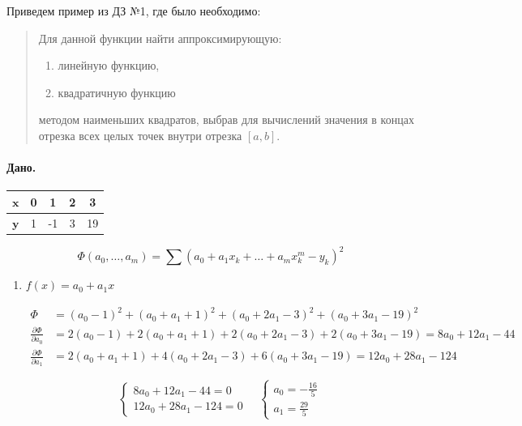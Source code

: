 \begin{example}
	Приведем пример из ДЗ №1, где было необходимо:
	\begin{quote}
		Для данной функции найти аппроксимирующую:
		\begin{enumerate}[label={\textbf{\alph*)}}, ref={\alph*}]
			\item линейную функцию,
			
			\item квадратичную функцию
		\end{enumerate}
		методом наименьших квадратов, выбрав для вычислений значения в концах отрезка всех целых точек внутри отрезка $[a, b]$.
	\end{quote} 
	
	\paragraph{Дано.} 
	
	\begin{table}[H]
		\centering
		\begin{tabular}{|c||c|c|c|c|}
			\hline 
			$\mathbf{x}$ & 0 & 1 & 2 & 3 \\ \hline 
			$\mathbf{y}$ & 1 & -1 & 3 & 19 \\ \hline 
		\end{tabular}
	\end{table}
	\begin{equation*}
		\Phi(a_0, \dotsc, a_m) = \sum (a_0 + a_1 x_k + \dotsc + a_m x^m_k - y_k)^2 
	\end{equation*}
	
	\begin{enumerate}[label=\textbf{{\alph*)}}, ref={\alph*}]
		\item $f(x) = a_0 + a_1 x$
		
		\begin{align*}
			\Phi &= (a_0 - 1)^2 + (a_0 + a_1 + 1)^2 + (a_0 + 2 a_1 - 3)^2 + (a_0 + 3 a_1 - 19)^2 \\
			\frac{\partial \Phi}{\partial a_0} &= 2 (a_0 - 1) + 2 (a_0 + a_1 + 1) + 2 (a_0 + 2 a_1 - 3) + 2 (a_0 + 3 a_1 - 19) = 8 a_0 + 12 a_1 - 44 \\
			\frac{\partial \Phi}{\partial a_1} &= 2 (a_0 + a_1 + 1) + 4 (a_0 + 2 a_1 - 3) + 6 (a_0 + 3 a_1 - 19) = 12 a_0 + 28 a_1 - 124 
		\end{align*}
		
		\begin{equation*}
			\begin{cases}
				8 a_0 + 12 a_1 - 44 = 0 \\
				12 a_0 + 28 a_1 - 124 = 0
			\end{cases} \quad 
			\begin{cases}
				a_0 = -\frac{16}{5} \\
				a_1 = \frac{29}{5} 
			\end{cases}
		\end{equation*}
		

\end{enumerate}
\end{example}
